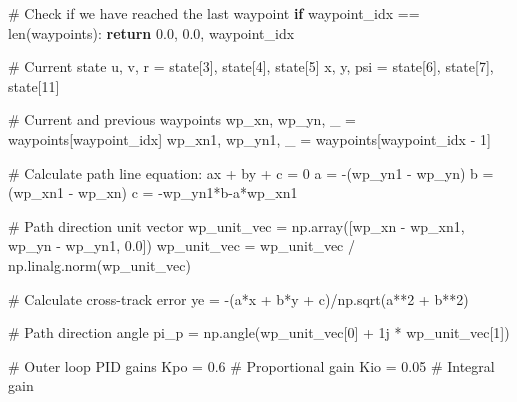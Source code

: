 \documentclass[
  letterpaper,
  DIV=11,
  numbers=noendperiod]{scrreprt}
\newenvironment{Shaded}{\begin{snugshade}}{\end{snugshade}}
\newcommand{\BuiltInTok}[1]{\textcolor[rgb]{0.00,0.23,0.31}{#1}}
\newcommand{\CommentTok}[1]{\textcolor[rgb]{0.37,0.37,0.37}{#1}}
\newcommand{\ControlFlowTok}[1]{\textcolor[rgb]{0.00,0.23,0.31}{\textbf{#1}}}
\newcommand{\DecValTok}[1]{\textcolor[rgb]{0.68,0.00,0.00}{#1}}
\newcommand{\FloatTok}[1]{\textcolor[rgb]{0.68,0.00,0.00}{#1}}
\newcommand{\NormalTok}[1]{\textcolor[rgb]{0.00,0.23,0.31}{#1}}
\newcommand{\OperatorTok}[1]{\textcolor[rgb]{0.37,0.37,0.37}{#1}}
\newcommand{\OtherTok}[1]{\textcolor[rgb]{0.00,0.23,0.31}{#1}}
\begin{document}
\begin{Shaded}
\begin{Highlighting}[]
    \CommentTok{\# Check if we have reached the last waypoint}
    \ControlFlowTok{if}\NormalTok{ waypoint\_idx }\OperatorTok{==} \BuiltInTok{len}\NormalTok{(waypoints):}
        \ControlFlowTok{return} \FloatTok{0.0}\NormalTok{, }\FloatTok{0.0}\NormalTok{, waypoint\_idx}

    \CommentTok{\# Current state}
\NormalTok{    u, v, r }\OperatorTok{=}\NormalTok{ state[}\DecValTok{3}\NormalTok{], state[}\DecValTok{4}\NormalTok{], state[}\DecValTok{5}\NormalTok{]}
\NormalTok{    x, y, psi }\OperatorTok{=}\NormalTok{ state[}\DecValTok{6}\NormalTok{], state[}\DecValTok{7}\NormalTok{], state[}\DecValTok{11}\NormalTok{]}
    
    \CommentTok{\# Current and previous waypoints}
\NormalTok{    wp\_xn, wp\_yn, \_ }\OperatorTok{=}\NormalTok{ waypoints[waypoint\_idx]}
\NormalTok{    wp\_xn1, wp\_yn1, \_ }\OperatorTok{=}\NormalTok{ waypoints[waypoint\_idx }\OperatorTok{{-}} \DecValTok{1}\NormalTok{]}

    \CommentTok{\# Calculate path line equation: ax + by + c = 0}
\NormalTok{    a }\OperatorTok{=} \OperatorTok{{-}}\NormalTok{(wp\_yn1 }\OperatorTok{{-}}\NormalTok{ wp\_yn)}
\NormalTok{    b }\OperatorTok{=}\NormalTok{ (wp\_xn1 }\OperatorTok{{-}}\NormalTok{ wp\_xn)}
\NormalTok{    c }\OperatorTok{=} \OperatorTok{{-}}\NormalTok{wp\_yn1}\OperatorTok{*}\NormalTok{b}\OperatorTok{{-}}\NormalTok{a}\OperatorTok{*}\NormalTok{wp\_xn1}
    
    \CommentTok{\# Path direction unit vector}
\NormalTok{    wp\_unit\_vec }\OperatorTok{=}\NormalTok{ np.array([wp\_xn }\OperatorTok{{-}}\NormalTok{ wp\_xn1, wp\_yn }\OperatorTok{{-}}\NormalTok{ wp\_yn1, }\FloatTok{0.0}\NormalTok{])}
\NormalTok{    wp\_unit\_vec }\OperatorTok{=}\NormalTok{ wp\_unit\_vec }\OperatorTok{/}\NormalTok{ np.linalg.norm(wp\_unit\_vec)}

    \CommentTok{\# Calculate cross{-}track error}
\NormalTok{    ye }\OperatorTok{=} \OperatorTok{{-}}\NormalTok{(a}\OperatorTok{*}\NormalTok{x }\OperatorTok{+}\NormalTok{ b}\OperatorTok{*}\NormalTok{y }\OperatorTok{+}\NormalTok{ c)}\OperatorTok{/}\NormalTok{np.sqrt(a}\OperatorTok{**}\DecValTok{2} \OperatorTok{+}\NormalTok{ b}\OperatorTok{**}\DecValTok{2}\NormalTok{)}
    
    \CommentTok{\# Path direction angle}
\NormalTok{    pi\_p }\OperatorTok{=}\NormalTok{ np.angle(wp\_unit\_vec[}\DecValTok{0}\NormalTok{] }\OperatorTok{+} \OtherTok{1j} \OperatorTok{*}\NormalTok{ wp\_unit\_vec[}\DecValTok{1}\NormalTok{]) }

    \CommentTok{\# Outer loop PID gains}
\NormalTok{    Kpo }\OperatorTok{=} \FloatTok{0.6}  \CommentTok{\# Proportional gain}
\NormalTok{    Kio }\OperatorTok{=} \FloatTok{0.05} \CommentTok{\# Integral gain}
    

\end{Highlighting}
\end{Shaded}
\end{document}
